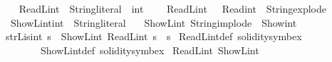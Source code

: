 \begin{isabellebody}
\endisatagproof
{\isafoldproof}%
%
\isadelimproof
\isanewline
%
\endisadelimproof
\isanewline
{}\isamarkupfalse%
\ \isanewline
\ \ ReadL\isactrlsub i\isactrlsub n\isactrlsub t\ {\isacharcolon}{\kern0pt}{\isacharcolon}{\kern0pt}\ {\isacartoucheopen}String{\isachardot}{\kern0pt}literal\ {\isasymRightarrow}\ int{\isacartoucheclose}\ {\isacharparenleft}{\kern0pt}{\isacartoucheopen}{\isasymlceil}{\isacharunderscore}{\kern0pt}{\isasymrceil}{\isacartoucheclose}{\isacharparenright}{\kern0pt}\ \ \isanewline
\ {\isacartoucheopen}ReadL\isactrlsub i\isactrlsub n\isactrlsub t\ \ {\isacharequal}{\kern0pt}\ Read\isactrlsub i\isactrlsub n\isactrlsub t\ {\isasymcirc}\ String{\isachardot}{\kern0pt}explode{\isacartoucheclose}\ \isanewline
\isanewline
{}\isamarkupfalse%
\ \isanewline
\ \ ShowL\isactrlsub i\isactrlsub n\isactrlsub t{\isacharcolon}{\kern0pt}{\isacharcolon}{\kern0pt}{\isacartoucheopen}int\ {\isasymRightarrow}\ String{\isachardot}{\kern0pt}literal{\isacartoucheclose}\ {\isacharparenleft}{\kern0pt}{\isacartoucheopen}{\isasymlfloor}{\isacharunderscore}{\kern0pt}{\isasymrfloor}{\isacartoucheclose}{\isacharparenright}{\kern0pt}\ \isanewline
\ {\isacartoucheopen}ShowL\isactrlsub i\isactrlsub n\isactrlsub t\ {\isacharequal}{\kern0pt}String{\isachardot}{\kern0pt}implode\ {\isasymcirc}\ Show\isactrlsub i\isactrlsub n\isactrlsub t{\isacartoucheclose}\isanewline
\isanewline
{}\isamarkupfalse%
\ \isanewline
\ {\isacartoucheopen}strL{\isacharunderscore}{\kern0pt}is{\isacharunderscore}{\kern0pt}int{\isacharprime}{\kern0pt}\ s\ {\isacharequal}{\kern0pt}\ {\isacharparenleft}{\kern0pt}ShowL\isactrlsub i\isactrlsub n\isactrlsub t\ {\isacharparenleft}{\kern0pt}ReadL\isactrlsub i\isactrlsub n\isactrlsub t\ s{\isacharparenright}{\kern0pt}\ {\isacharequal}{\kern0pt}\ s{\isacharparenright}{\kern0pt}{\isacartoucheclose}\isanewline
\isanewline
{}\isamarkupfalse%
\ ReadL\isactrlsub i\isactrlsub n\isactrlsub t{\isacharunderscore}{\kern0pt}def\ {\isacharbrackleft}{\kern0pt}solidity{\isacharunderscore}{\kern0pt}symbex{\isacharbrackright}{\kern0pt}\isanewline
\ \ \ \ \ \ \ \ ShowL\isactrlsub i\isactrlsub n\isactrlsub t{\isacharunderscore}{\kern0pt}def\ {\isacharbrackleft}{\kern0pt}solidity{\isacharunderscore}{\kern0pt}symbex{\isacharbrackright}{\kern0pt}\isanewline
\isanewline
{}\isamarkupfalse%
\ {\isacartoucheopen}ReadL\isactrlsub i\isactrlsub n\isactrlsub t\ {\isacharparenleft}{\kern0pt}ShowL\isactrlsub i\isactrlsub n\isactrlsub t\ \ \ {}{}{\isacharparenright}{\kern0pt}\ \ {\isacharequal}{\kern0pt}\ \ {}{}{\isacartoucheclose}\isanewline

\end{isabellebody}
